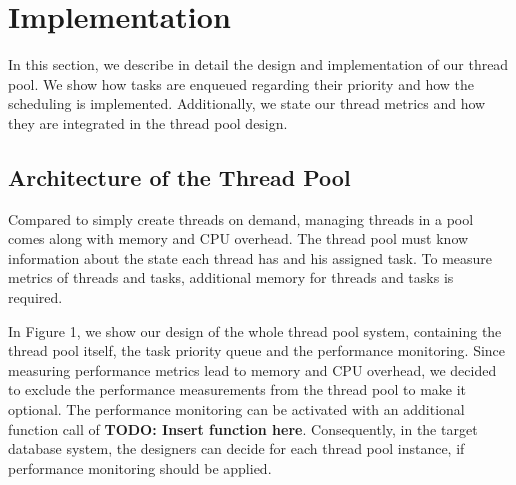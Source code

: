 \documentclass[conference]{IEEEtran}
\begin{document}

%

\section{Implementation}
In this section, we describe in detail the design and implementation of our thread pool. We show how tasks are enqueued regarding their priority and how the scheduling is implemented. Additionally, we state our thread metrics and how they are integrated in the thread pool design. 

\subsection{Architecture of the Thread Pool}
Compared to simply create threads on demand, managing threads in a pool comes along with memory and CPU overhead. The thread pool must know information about the state each thread has and his assigned task. To measure metrics of threads and tasks, additional memory for threads and tasks is required. 

In Figure 1, we show our design of the whole thread pool system, containing the thread pool itself, the task priority queue and the performance monitoring. Since measuring performance metrics lead to memory and CPU overhead, we decided to exclude the performance measurements from the thread pool to make it optional. The performance monitoring can be activated with an additional function call of \textbf{TODO: Insert function here}. Consequently, in the target database system, the designers can decide for each thread pool instance, if performance monitoring should be applied. 
\end{document}
